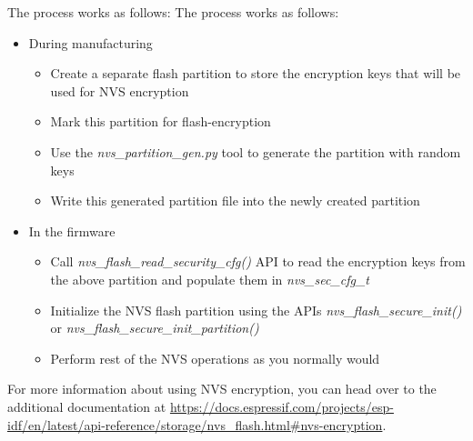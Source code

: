 \documentclass[main.tex]{subfiles}
\begin{document}
The process works as follows:
The process works as follows:
\begin{itemize}
\item During manufacturing
  \begin {itemize}
  \item Create a separate flash partition to store the encryption keys that will be used for NVS encryption
  \item Mark this partition for flash-encryption
  \item Use the \textit{nvs\_partition\_gen.py} tool to generate the partition with random keys
  \item Write this generated partition file into the newly created partition
  \end {itemize}
\item In the firmware
  \begin {itemize}
  \item Call \textit{nvs\_flash\_read\_security\_cfg()} API to read the encryption keys from the above partition and populate them in \textit{nvs\_sec\_cfg\_t}
  \item Initialize the NVS flash partition using the APIs \textit{nvs\_flash\_secure\_init()} or \textit{nvs\_flash\_secure\_init\_partition()}
  \item Perform rest of the NVS operations as you normally would
  \end {itemize}
\end{itemize}

For more information about using NVS encryption, you can head over to the additional documentation at \url{https://docs.espressif.com/projects/esp-idf/en/latest/api-reference/storage/nvs_flash.html#nvs-encryption}.
\end{document}
